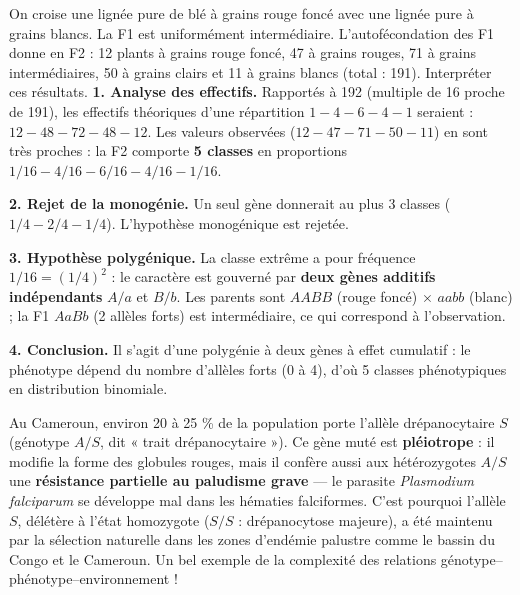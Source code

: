 \documentclass[11pt]{article}
\newcommand{\cle}[1]{{\popxbold\color{popdark}#1}}
\newcounter{popsec}
\newcounter{popsub}
\newcommand{\courssub}[1]{%
  \stepcounter{popsub}%
  \par\vspace{9pt}\noindent{\popxbold\fontsize{11.5}{13}\selectfont\color{popink}{\color{poporange}\thepopsec.\thepopsub}\hspace{6pt}#1}\par\nopagebreak\vspace{4pt}
}
\begin{document}
\begin{exoresolu}
On croise une lignée pure de blé à grains rouge foncé avec une lignée pure à grains blancs. La F1 est uniformément intermédiaire. L'autofécondation des F1 donne en F2 : 12 plants à grains rouge foncé, 47 à grains rouges, 71 à grains intermédiaires, 50 à grains clairs et 11 à grains blancs (total : 191). Interpréter ces résultats.
\tcblower
\textbf{1. Analyse des effectifs.} Rapportés à 192 (multiple de 16 proche de 191), les effectifs théoriques d'une répartition $1-4-6-4-1$ seraient : $12 - 48 - 72 - 48 - 12$. Les valeurs observées ($12 - 47 - 71 - 50 - 11$) en sont très proches : la F2 comporte \textbf{5 classes} en proportions $1/16 - 4/16 - 6/16 - 4/16 - 1/16$.

\textbf{2. Rejet de la monogénie.} Un seul gène donnerait au plus 3 classes ($1/4 - 2/4 - 1/4$). L'hypothèse monogénique est rejetée.

\textbf{3. Hypothèse polygénique.} La classe extrême a pour fréquence $1/16 = (1/4)^2$ : le caractère est gouverné par \textbf{deux gènes additifs indépendants} $A/a$ et $B/b$. Les parents sont $AABB$ (rouge foncé) $\times$ $aabb$ (blanc) ; la F1 $AaBb$ (2 allèles forts) est intermédiaire, ce qui correspond à l'observation.

\textbf{4. Conclusion.} Il s'agit d'une \cle{polygénie} à deux gènes à effet cumulatif : le phénotype dépend du nombre d'allèles forts (0 à 4), d'où 5 classes phénotypiques en distribution binomiale.
\end{exoresolu}

\begin{savaistu}
Au Cameroun, environ 20 à 25 \% de la population porte l'allèle drépanocytaire $S$ (génotype $A/S$, dit « trait drépanocytaire »). Ce gène muté est \textbf{pléiotrope} : il modifie la forme des globules rouges, mais il confère aussi aux hétérozygotes $A/S$ une \textbf{résistance partielle au paludisme grave} — le parasite \emph{Plasmodium falciparum} se développe mal dans les hématies falciformes. C'est pourquoi l'allèle $S$, délétère à l'état homozygote ($S/S$ : drépanocytose majeure), a été maintenu par la sélection naturelle dans les zones d'endémie palustre comme le bassin du Congo et le Cameroun. Un bel exemple de la complexité des relations génotype--phénotype--environnement !
\end{savaistu}

\courssub{Bilan : les limites des lois de Mendel}
\end{document}
